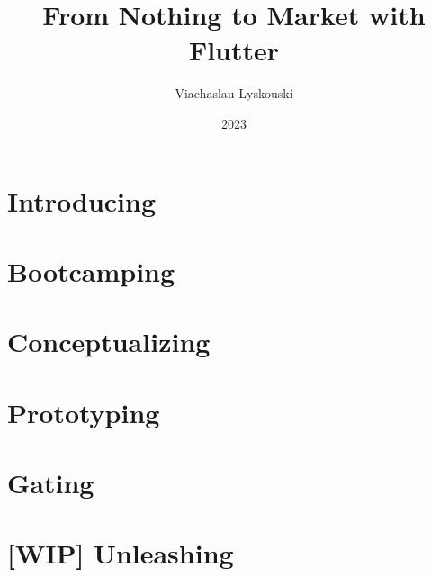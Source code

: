 \documentclass[12pt, a4paper, twoside]{extreport}
\author{Viachaslau Lyskouski}
\title{From Nothing to Market with Flutter}
\date{2023}
\begin{document}


\maketitle

%

\tableofcontents



\newpage
\section*{Introducing}


\newpage
\section{Bootcamping}



\newpage
\section{Conceptualizing}


\newpage
\section{Prototyping}


\newpage





\newpage
\section{Gating}







\newpage
\section{[WIP] Unleashing}






\end{document}
